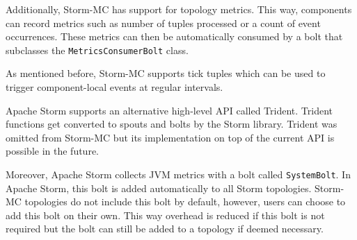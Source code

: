 Additionally, Storm-MC has support for topology metrics. This way, components can record metrics such as number of tuples processed or a count of event occurrences. These metrics can then be automatically consumed by a bolt that subclasses the \texttt{MetricsConsumerBolt} class.

As mentioned before, Storm-MC supports tick tuples which can be used  to trigger component-local events at regular intervals.

Apache Storm supports an alternative high-level API called Trident. Trident functions get converted to spouts and bolts by the Storm library. Trident was omitted from Storm-MC but its implementation on top of the current API is possible in the future.

Moreover, Apache Storm collects JVM metrics with a bolt called \texttt{SystemBolt}. In Apache Storm, this bolt is added automatically to all Storm topologies. Storm-MC topologies do not include this bolt by default, however, users can choose to add this bolt on their own. This way overhead is reduced if this bolt is not required but the bolt can still be added to a topology if deemed necessary.
